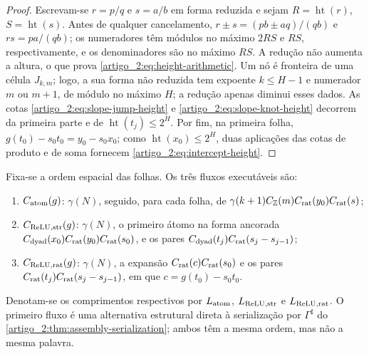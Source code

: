 \documentclass[12pt,a4paper]{article}
\theoremstyle{preciso}
\theoremstyle{definition}
\newcommand{\height}{\operatorname{ht}}
\theoremstyle{preciso}
\theoremstyle{preciso}
\theoremstyle{preciso}
\theoremstyle{preciso}
\theoremstyle{definition}
\theoremstyle{preciso}
\theoremstyle{definition}
\theoremstyle{preciso}
\theoremstyle{preciso}
\theoremstyle{definition}
\begin{document}
\begin{proof}
Escrevam-se $r=p/q$ e $s=a/b$ em forma reduzida e sejam
$R=\height(r)$, $S=\height(s)$. Antes de qualquer cancelamento,
$r\pm s=(pb\pm aq)/(qb)$ e $rs=pa/(qb)$; os numeradores têm módulos no
máximo $2RS$ e $RS$, respectivamente, e os denominadores são no máximo
$RS$. A redução não aumenta a altura, o que prova
\eqref{artigo_2:eq:height-arithmetic}. Um nó é fronteira de uma célula
$J_{k,m}$; logo, a sua forma não reduzida tem expoente $k\le H-1$ e numerador
$m$ ou $m+1$, de módulo no máximo $H$; a redução apenas diminui esses dados. As
cotas \eqref{artigo_2:eq:slope-jump-height} e \eqref{artigo_2:eq:slope-knot-height} decorrem da
primeira parte e de $\height(t_j)\le2^H$. Por fim, na primeira folha,
$g(t_0)-s_0t_0=y_0-s_0x_0$; como
$\height(x_0)\le2^H$, duas aplicações das cotas de produto e de soma fornecem
\eqref{artigo_2:eq:intercept-height}.
\end{proof}

Fixa-se a ordem espacial das folhas. Os três fluxos executáveis são:
\begin{enumerate}[label=(\roman*),leftmargin=2.1em]
 \item $C_{\rm atom}(g)$: $\gamma(N)$, seguido, para cada folha, de
 $\gamma(k+1)C_{\mathbb Z}(m)C_{\rm rat}(y_0)C_{\rm rat}(s)$;
 \item $C_{\rm ReLU,str}(g)$: $\gamma(N)$, o primeiro átomo na forma ancorada
 $C_{\rm dyad}(x_0)C_{\rm rat}(y_0)C_{\rm rat}(s_0)$, e os pares
 $C_{\rm dyad}(t_j)C_{\rm rat}(s_j-s_{j-1})$;
 \item $C_{\rm ReLU,rat}(g)$: $\gamma(N)$, a expansão
 $C_{\rm rat}(c)C_{\rm rat}(s_0)$ e os pares
 $C_{\rm rat}(t_j)C_{\rm rat}(s_j-s_{j-1})$, em que
 $c=g(t_0)-s_0t_0$.
\end{enumerate}
Denotam-se os comprimentos respectivos por $L_{\rm atom}$,
$L_{\rm ReLU,str}$ e $L_{\rm ReLU,rat}$. O primeiro fluxo é uma alternativa
estrutural direta à serialização por $\Gamma^\sharp$ do
\cref{artigo_2:thm:assembly-serialization}; ambos têm a mesma ordem, mas não a mesma
palavra.
\end{document}

